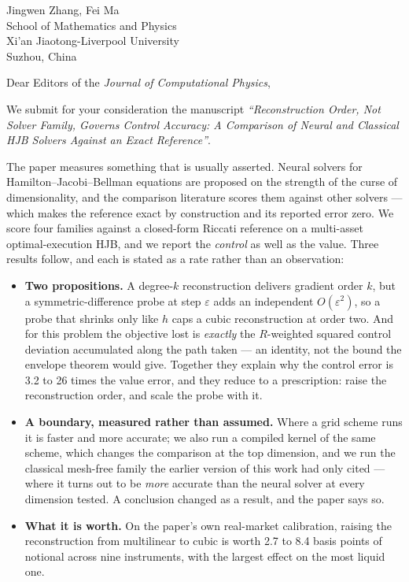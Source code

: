 \documentclass[11pt]{article}
\begin{document}
\begin{flushright}
Jingwen Zhang, Fei Ma\\
School of Mathematics and Physics\\
Xi'an Jiaotong-Liverpool University\\
Suzhou, China
\end{flushright}

\vspace{1em}
\noindent Dear Editors of the \emph{Journal of Computational Physics},

\vspace{0.6em}
\noindent We submit for your consideration the manuscript \emph{``Reconstruction Order, Not Solver
Family, Governs Control Accuracy: A Comparison of Neural and Classical HJB Solvers Against an Exact
Reference''}.

\noindent The paper measures something that is usually asserted. Neural solvers for
Hamilton--Jacobi--Bellman equations are proposed on the strength of the curse of dimensionality, and
the comparison literature scores them against other solvers --- which makes the reference exact by
construction and its reported error zero. We score four families against a closed-form Riccati
reference on a multi-asset optimal-execution HJB, and we report the \emph{control} as well as the
value. Three results follow, and each is stated as a rate rather than an observation:

\begin{itemize}
\item \textbf{Two propositions.} A degree-$k$ reconstruction delivers gradient order $k$, but a
symmetric-difference probe at step $\varepsilon$ adds an independent $O(\varepsilon^2)$, so a probe
that shrinks only like $h$ caps a cubic reconstruction at order two. And for this problem the
objective lost is \emph{exactly} the $R$-weighted squared control deviation accumulated along the path
taken --- an identity, not the bound the envelope theorem would give. Together they explain why the
control error is 3.2 to 26 times the value error, and they reduce to a prescription: raise the
reconstruction order, and scale the probe with it.
\item \textbf{A boundary, measured rather than assumed.} Where a grid scheme runs it is faster and
more accurate; we also run a compiled kernel of the same scheme, which changes the comparison at the
top dimension, and we run the classical mesh-free family the earlier version of this work had only
cited --- where it turns out to be \emph{more} accurate than the neural solver at every dimension
tested. A conclusion changed as a result, and the paper says so.
\item \textbf{What it is worth.} On the paper's own real-market calibration, raising the
reconstruction from multilinear to cubic is worth 2.7 to 8.4 basis points of notional across nine
instruments, with the largest effect on the most liquid one.
\end{itemize}
\end{document}
